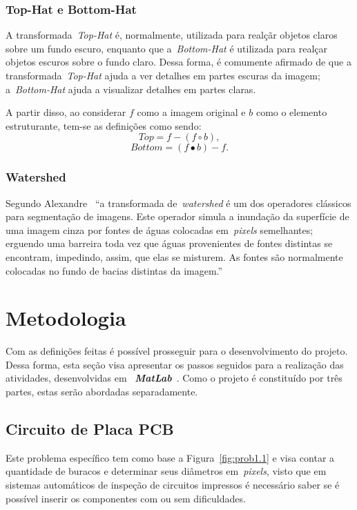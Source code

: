 \documentclass[conference]{Trabalho_2}
\begin{document}
\subsubsection{Top-Hat e Bottom-Hat}
A transformada~\textit{Top-Hat} \'e, normalmente, utilizada para real\c{c}\~ar objetos claros sobre um fundo escuro, enquanto que a~\textit{Bottom-Hat} \'e utilizada para real\c{c}ar objetos escuros sobre o fundo claro. Dessa forma, \'e comumente afirmado de que a transformada~\textit{Top-Hat} ajuda a ver detalhes em partes escuras da imagem; a~\textit{Bottom-Hat} ajuda a visualizar detalhes em partes claras.

A partir disso, ao considerar $f$ como a imagem original e $b$ como o elemento estruturante, tem-se as defini\c{c}\~oes como sendo:
$$ Top = f - (f \circ b),$$ 
$$ Bottom = (f \bullet b) - f.$$

\subsubsection{Watershed}
Segundo Alexandre~\cite{water} ``a transformada de~\textit{watershed} \'e um dos operadores cl\'assicos para segmenta\c{c}\~ao de imagens. Este operador simula a inunda\c{c}\~ao da superf\'icie de uma imagem cinza por fontes de \'aguas colocadas em~\textit{pixels} semelhantes; erguendo uma barreira toda vez que \'aguas provenientes de fontes distintas se encontram, impedindo, assim, que elas se misturem. As fontes s\~ao normalmente colocadas no fundo de bacias distintas da imagem.''


\section{Metodologia}
Com as defini\c{c}\~oes feitas \'e poss\'ivel prosseguir para o desenvolvimento do projeto. Dessa forma, esta se\c{c}\~ao visa apresentar os passos seguidos para a realiza\c{c}\~ao das atividades, desenvolvidas em ~\textbf{\textit{MatLab}}~\cite{matlab}. Como o projeto \'e constitu\'ido por tr\^es partes, estas ser\~ao abordadas separadamente.

\subsection{Circuito de Placa PCB}
Este problema espec\'ifico tem como base a Figura~\ref{fig:prob1.1} e visa contar a quantidade de buracos e determinar seus di\^ametros em~\textit{pixels}, visto que em sistemas autom\'aticos de inspe\c{c}\~ao de circuitos impressos \'e necess\'ario saber se \'e poss\'ivel inserir os componentes com ou sem dificuldades.
\end{document}
